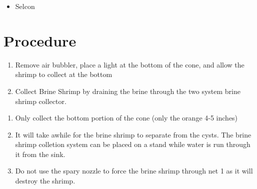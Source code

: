 \documentclass[
  letterpaper,
  DIV=11,
  numbers=noendperiod]{scrreprt}
\providecommand{\tightlist}{%
  \setlength{\itemsep}{0pt}\setlength{\parskip}{0pt}}\usepackage{longtable,booktabs,array}
\begin{document}
\begin{itemize}
\tightlist
\item
  Selcon
\end{itemize}

\hypertarget{procedure-40}{%
\section{Procedure}\label{procedure-40}}

\begin{enumerate}
\def\labelenumi{\arabic{enumi}.}
\tightlist
\item
  Remove air bubbler, place a light at the bottom of the cone, and allow
  the shrimp to collect at the bottom\\
\item
  Collect Brine Shrimp by draining the brine through the two system
  brine shrimp collector.
\end{enumerate}

\begin{tcolorbox}[enhanced jigsaw, rightrule=.15mm, title=\textcolor{quarto-callout-note-color}{\faInfo}\hspace{0.5em}{NOTES}, titlerule=0mm, opacitybacktitle=0.6, toprule=.15mm, bottomrule=.15mm, opacityback=0, left=2mm, colframe=quarto-callout-note-color-frame, breakable, coltitle=black, colback=white, colbacktitle=quarto-callout-note-color!10!white, bottomtitle=1mm, leftrule=.75mm, toptitle=1mm, arc=.35mm]

\begin{enumerate}
\def\labelenumi{\alph{enumi}.}
\tightlist
\item
  Only collect the bottom portion of the cone (only the orange 4-5
  inches)
\item
  It will take awhile for the brine shrimp to separate from the cysts.
  The brine shrimp colletion system can be placed on a stand while water
  is run through it from the sink.
\item
  Do not use the spary nozzle to force the brine shrimp through net 1 as
  it will destroy the shrimp.
\end{enumerate}

\end{tcolorbox}
\end{document}
